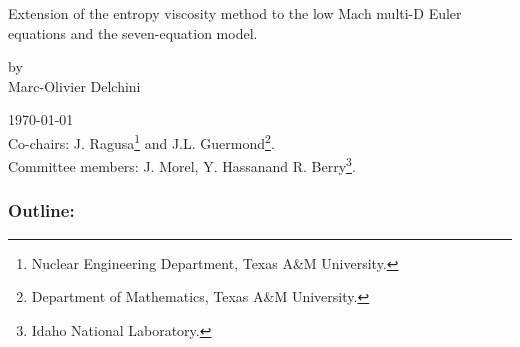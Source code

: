 \documentclass[xcolor=dvipsnames,10pt]{beamer}
\begin{document}
%
\begin{frame}
\begin{center}
Extension of the entropy viscosity method to the low Mach multi-D Euler equations and the seven-equation model.
\begin{center}
by \\
Marc-Olivier Delchini
\end{center}
\today \\

Co-chairs: J. Ragusa\footnote{Nuclear Engineering Department, Texas A\&M University.} and J.L. Guermond\footnote{Department of Mathematics, Texas A\&M University.}. \\
Committee members: J. Morel\footnotemark[1], Y. Hassan\footnotemark[1] and R. Berry\footnote{Idaho National Laboratory.}.
\end{center}
\end{frame}
%
\begin{frame}
	\frametitle{Outline:}
	\tableofcontents
\end{frame}
\end{document}
